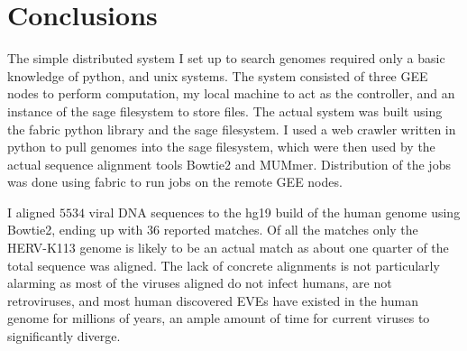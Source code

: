 
\section{Conclusions}

The simple distributed system I set up to search genomes required only a basic knowledge of python, and unix systems. The system consisted of three GEE nodes to perform computation, my local machine to act as the controller, and an instance of the sage filesystem to store files. The actual system was built using the fabric python library and the sage filesystem. I used a web crawler written in python to pull genomes into the sage filesystem, which were then used by the actual sequence alignment tools Bowtie2 and MUMmer. Distribution of the jobs was done using fabric to run jobs on the remote GEE nodes.

I aligned $5534$ viral DNA sequences to the hg19 build of the human genome using Bowtie2, ending up with $36$ reported matches. Of all the matches only the HERV-K113 genome is likely to be an actual match as about one quarter of the total sequence was aligned. The lack of concrete alignments is not particularly alarming as most of the viruses aligned do not infect humans, are not retroviruses, and most human discovered EVEs have existed in the human genome for millions of years, an ample amount of time for current viruses to significantly diverge.